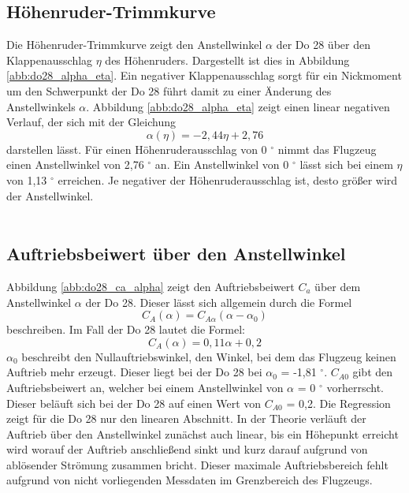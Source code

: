 \subsection{Höhenruder-Trimmkurve}
Die Höhenruder-Trimmkurve zeigt den Anstellwinkel $\alpha$ der Do 28 über den Klappenausschlag $\eta$ des Höhenruders. Dargestellt ist dies in Abbildung \ref{abb:do28_alpha_eta}. Ein negativer Klappenausschlag sorgt für ein Nickmoment um den Schwerpunkt der Do 28 führt damit zu einer Änderung des Anstellwinkels $\alpha$. Abbildung \ref{abb:do28_alpha_eta} zeigt einen linear negativen Verlauf, der sich mit der Gleichung
\begin{equation}
\alpha(\eta) = -2,44\eta + 2,76
\end{equation}
darstellen lässt. Für einen Höhenruderausschlag von 0 $^\circ$ nimmt das Flugzeug einen Anstellwinkel von 2,76 $^\circ$ an. Ein Anstellwinkel von 0 $^\circ$ lässt sich bei einem $\eta$ von 1,13 $^\circ$ erreichen. Je negativer der Höhenruderausschlag ist, desto größer wird der Anstellwinkel.
 \\\\
\subsection{Auftriebsbeiwert über den Anstellwinkel}
Abbildung \ref{abb:do28_ca_alpha} zeigt den Auftriebsbeiwert $C_a$ über dem Anstellwinkel $\alpha$ der Do 28. Dieser lässt sich allgemein durch die Formel
\begin{equation}  \label{eq:theorie_ca}
C_A(\alpha) = C_{A\alpha}(\alpha - \alpha_0)
\end{equation}
beschreiben. Im Fall der Do 28 lautet die Formel:
\begin{equation}  \label{eq:versuch_ca}
C_A(\alpha) = 0,11\alpha + 0,2
\end{equation}
$\alpha_{0}$ beschreibt den Nullauftriebswinkel, den Winkel, bei dem das Flugzeug keinen Auftrieb mehr erzeugt. Dieser liegt bei der Do 28 bei $\alpha_{0}$ = -1,81 $^\circ$. $C_{A0}$ gibt den Auftriebsbeiwert an, welcher bei einem Anstellwinkel von $\alpha$ = 0 $^\circ$ vorherrscht. Dieser beläuft sich bei der Do 28 auf einen Wert von $C_{A0}$ = 0,2. Die Regression zeigt für die Do 28 nur den linearen Abschnitt. In der Theorie verläuft der Auftrieb über den Anstellwinkel zunächst auch linear, bis ein Höhepunkt erreicht wird worauf der Auftrieb anschließend sinkt und kurz darauf aufgrund von ablösender Strömung zusammen bricht.  
Dieser maximale Auftriebsbereich fehlt aufgrund von nicht vorliegenden Messdaten im Grenzbereich des Flugzeugs. 
\\\\

